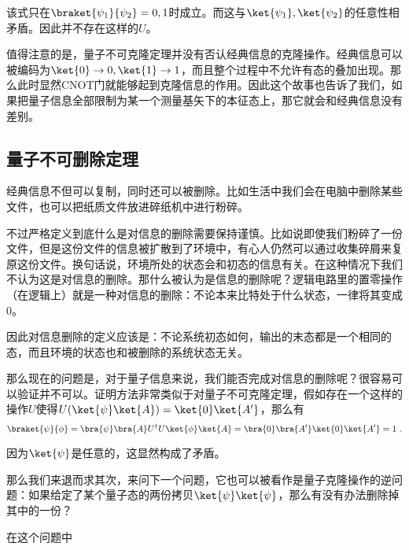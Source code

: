 该式只在$\braket{\psi_1}{\psi_2}=0,1$时成立。而这与$\ket{\psi_1},\ket{\psi_2}$的任意性相矛盾。因此并不存在这样的$U$。

值得注意的是，量子不可克隆定理并没有否认经典信息的克隆操作。经典信息可以被编码为$\ket{0}\to0,\ket{1}\to1$，而且整个过程中不允许有态的叠加出现。那么此时显然CNOT门就能够起到克隆信息的作用。因此这个故事也告诉了我们，如果把量子信息全部限制为某一个测量基矢下的本征态上，那它就会和经典信息没有差别。

\subsection{量子不可删除定理}

经典信息不但可以复制，同时还可以被删除。比如生活中我们会在电脑中删除某些文件，也可以把纸质文件放进碎纸机中进行粉碎。

不过严格定义到底什么是对信息的删除需要保持谨慎。比如说即使我们粉碎了一份文件，但是这份文件的信息被扩散到了环境中，有心人仍然可以通过收集碎屑来复原这份文件。换句话说，环境所处的状态会和初态的信息有关。在这种情况下我们不认为这是对信息的删除。那什么被认为是信息的删除呢？逻辑电路里的置零操作（在逻辑上）就是一种对信息的删除：不论本来比特处于什么状态，一律将其变成0。

因此对信息删除的定义应该是：不论系统初态如何，输出的末态都是一个相同的态，而且环境的状态也和被删除的系统状态无关。

那么现在的问题是，对于量子信息来说，我们能否完成对信息的删除呢？很容易可以验证并不可以。证明方法非常类似于对量子不可克隆定理，假如存在一个这样的操作$U$使得$U(\ket{\psi}\ket{A})=\ket{0}\ket{A'}$，那么有
\begin{equation}
\braket{\psi}{\phi}=\bra{\psi}\bra{A}U^\dagger U\ket{\phi}\ket{A}=\bra{0}\bra{A'}\ket{0}\ket{A'}=1~.
\end{equation}

因为$\ket{\psi}$是任意的，这显然构成了矛盾。

那么我们来退而求其次，来问下一个问题，它也可以被看作是量子克隆操作的逆问题：如果给定了某个量子态的两份拷贝$\ket{\psi}\ket{\psi}$，那么有没有办法删除掉其中的一份？

在这个问题中